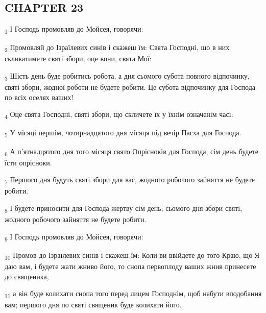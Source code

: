 \subsection{CHAPTER 23}
\begin{tcolorbox}
\textsubscript{1} І Господь промовляв до Мойсея, говорячи:
\end{tcolorbox}
\begin{tcolorbox}
\textsubscript{2} Промовляй до Ізраїлевих синів і скажеш їм: Свята Господні, що в них скликатимете святі збори, оце вони, свята Мої:
\end{tcolorbox}
\begin{tcolorbox}
\textsubscript{3} Шість день буде робитись робота, а дня сьомого субота повного відпочинку, святі збори, жодної роботи не будете робити. Це субота відпочинку для Господа по всіх оселях ваших!
\end{tcolorbox}
\begin{tcolorbox}
\textsubscript{4} Оце свята Господні, святі збори, що скличете їх у їхнім означенім часі:
\end{tcolorbox}
\begin{tcolorbox}
\textsubscript{5} У місяці першім, чотирнадцятого дня місяця під вечір Пасха для Господа.
\end{tcolorbox}
\begin{tcolorbox}
\textsubscript{6} А п'ятнадцятого дня того місяця свято Опрісноків для Господа, сім день будете їсти опрісноки.
\end{tcolorbox}
\begin{tcolorbox}
\textsubscript{7} Першого дня будуть святі збори для вас, жодного робочого зайняття не будете робити.
\end{tcolorbox}
\begin{tcolorbox}
\textsubscript{8} І будете приносити для Господа жертву сім день; сьомого дня збори святі, жодного робочого зайняття не будете робити.
\end{tcolorbox}
\begin{tcolorbox}
\textsubscript{9} І Господь промовляв до Мойсея, говорячи:
\end{tcolorbox}
\begin{tcolorbox}
\textsubscript{10} Промов до Ізраїлевих синів і скажеш їм: Коли ви ввійдете до того Краю, що Я даю вам, і будете жати жниво його, то снопа первоплоду ваших жнив принесете до священика,
\end{tcolorbox}
\begin{tcolorbox}
\textsubscript{11} а він буде колихати снопа того перед лицем Господнім, щоб набути вподобання вам; першого дня по святі священик буде колихати його.
\end{tcolorbox}

